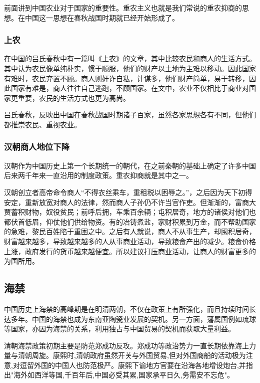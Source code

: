 前面讲到中国农业对于国家的重要性。重农主义也就是我们常说的重农抑商的思想。在中国这一思想在春秋战国时期就已经开始形成了。

\subsubsection{上农}

在中国的吕氏春秋中有一篇叫《上农》的文章，其中比较农民和商人的生活方式。其中认为农民像单纯朴实，惯于顺服，他们的财产以土地为主难以移动。因此国家有难时，农民弃置不顾。商人则奸诈自私，计谋多，他们财产简单，易于转移，因此国家有难是，商人往往自己逃跑，不顾国家。在文中，农业不仅相比于商业对国家更重要，农民的生活方式也更为高尚。

吕氏春秋，反映出中国在春秋战国时期诸子百家，虽然各家思想各有不同，但他们都推崇农民、重视农业。

\subsubsection{汉朝商人地位下降}

汉朝作为中国历史上第一个长期统一的朝代，在之前秦朝的基础上确定了许多中国后来两千年来一直沿用的制度政策。重农抑商就是其中之一。

汉朝创立者高帝命令商人“不得衣丝乘车，重租税以困辱之。”，之后因为天下初得安定，重新放宽对商人的法律，然而商人子孙仍不许当官作吏。但渐渐的，富商大贾蓄积财物，奴役贫民；前呼后拥，车乘百余辆；屯积居奇，地方的诸侯对他们也都伏首低眉，仰仗他们供给物资。有的冶铸煮盐，家财积累到万金，而不帮助国家的急难，黎民百姓陷于重困之中。之后有人就说，商人不从事生产，却囤积居奇，财富越来越多，导致越来越多的人从事商业活动，导致粮食产出的减少。粮食价格上涨，政府发行的货币越来越便宜。所以建议打压商业活动，让商人的财富更多的为国所用。

\subsection{海禁}

中国历史上海禁的高峰期是在明清两朝，不仅在政策上有所强化，而且持续时间长达多年。中国的海禁也成为东南亚陶瓷业发展的契机。另一方面，藩属国例如琉球等国家，亦因为海禁的关系，利用独占与中国贸易的契机而获取大量利益。

清朝海禁政策初期主要是防范郑成功反攻。郑成功等政治势力一直长期依靠海上力量与清朝周旋。康熙时,清朝政府虽然开关与外国贸易,但对外国商船的活动极为注意,对逗留外国的中国人也防范极严。康熙下谕地方官要在沿海各地增设炮台,并指出"海外如西洋等国,千百年后,中国必受其累,国家承平日久,务需安不忘危"。
